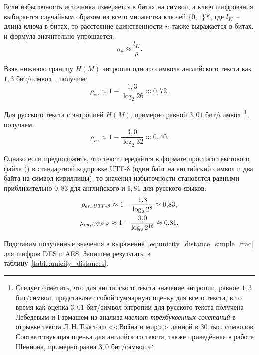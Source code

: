 Если избыточность источника измеряется в битах на символ, а ключ шифрования выбирается случайным образом из всего множества ключей $\{0, 1\}^{l_K}$, где $l_K$~-- длина ключа в битах, то расстояние единственности $n$ также выражается в битах, и формула значительно упрощается:
\begin{equation}\label{eq:unicity_distance_simple_frac}
n_u \approx \frac{l_K}{\rho}.
\end{equation}

Взяв нижнюю границу $H(M)$ энтропии одного символа английского текста как $1{,}3$ бит/символ~\cite{Shannon:1951, Schneier:2002}, получим:
	\[ \rho _{en} \approx 1 - \frac{ 1{,}3 }{ \log _2 {26} } \approx 0{,}72.\]

Для русского текста с энтропией $H(M)$, примерно равной $3{,}01$ бит/символ~\cite{Lebedev:1958}\footnote{Следует отметить, что для английского текста значение энтропии, равное $1{,}3$ бит/символ, представляет собой суммарную оценку для всего текста, в то время как оценка $3{,}01$ бит/символ энтропии для русского текста получена Лебедевым и Гармашем из анализа \emph{частот трёхбуквенных сочетаний} в отрывке текста Л.\,Н.\,Толстого <<Война и мир>> длиной в 30 тыс. символов. Соответствующая оценка для английского текста, также приведённая в работе Шеннона, примерно равна $3{,}0$ бит/символ.}, получаем:
	\[ \rho _{ru} \approx 1 - \frac{ 3{,}0 }{ \log _2 {32} } \approx 0{,}40.\]

Однако если предположить, что текст передаётся в формате простого текстового файла () в стандартной кодировке UTF-8 (один байт на английский символ и два байта на символ кириллицы), то значения избыточности становятся равными приблизительно $0{,}83$ для английского и $0{,}81$ для русского языков:
\begin{gather*}
\rho _{en, \text{\textit{UTF-8}}} \approx 1 - \frac{ 1{,}3 }{ \log _2 {2^{8}} } \approx 0{,}83,\\
\rho _{ru, \text{\textit{UTF-8}}} \approx 1 - \frac{ 3{,}0 }{ \log _2 {2^{16}} } \approx 0{,}81.
\end{gather*} 

Подставим полученные значения в выражение~\ref{eq:unicity_distance_simple_frac} для шифров DES и AES. Запишем результаты в таблицу~\ref{table:unicity_distances}.

